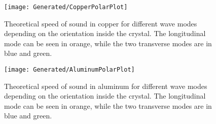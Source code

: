 \documentclass[a4paper,10pt,twocolumn]{article}
\begin{document}
    \begin{figure}
        \begin{center}
            \texttt{[image: Generated/CopperPolarPlot]}
            \caption[]{Theoretical speed of sound in copper for different wave modes depending on the orientation inside the crystal.
            The longitudinal mode can be seen in orange, while the two transverse modes are in blue and green.}
            \label{fig:Copperpolarplot}
        \end{center}
    \end{figure}
    \begin{figure}
        \begin{center}
            \texttt{[image: Generated/AluminumPolarPlot]}
            \caption[]{Theoretical speed of sound in aluminum for different wave modes depending on the orientation inside the crystal.
            The longitudinal mode can be seen in orange, while the two transverse modes are in blue and green.}
            \label{fig:AluPolarPlot}
        \end{center}
    \end{figure}
\end{document}
